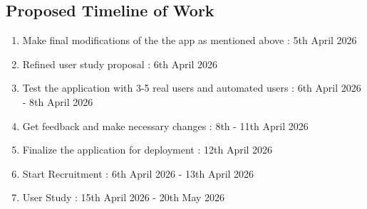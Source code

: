 \documentclass{article}
\begin{document}
\subsection{Proposed Timeline of Work}
\begin{enumerate}
    \item Make final modifications of the the app as mentioned above : 5th April 2026
    \item Refined user study proposal : 6th April 2026
    \item Test the application with 3-5 real users and automated users : 6th April 2026 - 8th April 2026
    \item Get feedback and make necessary changes : 8th - 11th April 2026
    \item Finalize the application for deployment : 12th April 2026
    \item Start Recruitment : 6th April 2026 - 13th April 2026
    \item User Study : 15th April 2026 - 20th May 2026
\end{enumerate}


\newpage
\end{document}
